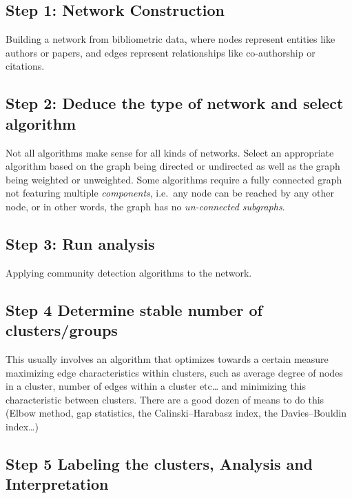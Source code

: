 \documentclass[
  letterpaper,
]{scrreprt}
\begin{document}
\subsection{Step 1: Network
Construction}\label{step-1-network-construction}

Building a network from bibliometric data, where nodes represent
entities like authors or papers, and edges represent relationships like
co-authorship or citations.

\subsection{Step 2: Deduce the type of network and select
algorithm}\label{step-2-deduce-the-type-of-network-and-select-algorithm}

Not all algorithms make sense for all kinds of networks. Select an
appropriate algorithm based on the graph being directed or undirected as
well as the graph being weighted or unweighted. Some algorithms require
a fully connected graph not featuring multiple \emph{components},
i.e.~any node can be reached by any other node, or in other words, the
graph has no \emph{un-connected subgraphs}.

\subsection{Step 3: Run analysis}\label{step-3-run-analysis}

Applying community detection algorithms to the network.

\subsection{Step 4 Determine stable number of
clusters/groups}\label{step-4-determine-stable-number-of-clustersgroups}

This usually involves an algorithm that optimizes towards a certain
measure maximizing edge characteristics within clusters, such as average
degree of nodes in a cluster, number of edges within a cluster
etc\ldots{} and minimizing this characteristic between clusters. There
are a good dozen of means to do this (Elbow method, gap statistics, the
Calinski--Harabasz index, the Davies--Bouldin index\ldots)

\subsection{Step 5 Labeling the clusters, Analysis and
Interpretation}\label{step-5-labeling-the-clusters-analysis-and-interpretation}
\end{document}
